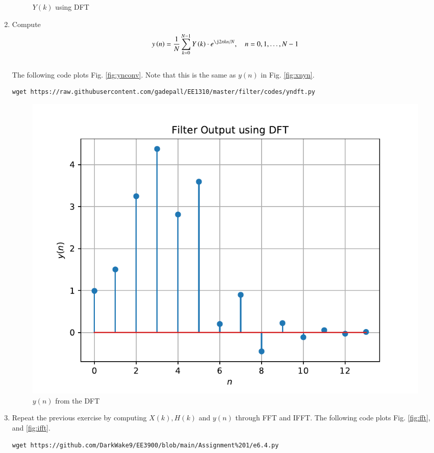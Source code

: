 \documentclass[journal,12pt,twocolumn]{IEEEtran}
\renewcommand\thesection{\arabic{section}}
\begin{document}
\begin{enumerate}[label=\thesection.\arabic*]
\begin{figure}[!ht]
		\caption{$Y(k)$ using DFT}
		\label{fig:Ykdft}
	\end{figure}
	\item Compute
	\begin{equation}
		y\brak{n}={\frac {1}{N}}\sum _{k=0}^{N-1}Y\brak{k}\cdot e^{\j 2\pi kn/N},\quad n = 0,1,\dots, N-1
	\end{equation}
	\\
	\solution The following code plots Fig. \ref{fig:ynconv}. Note that this is the same as 
	$y(n)$ in  Fig. 
	\ref{fig:xnyn}. 
	\begin{lstlisting}
wget https://raw.githubusercontent.com/gadepall/EE1310/master/filter/codes/yndft.py
	\end{lstlisting}
	\begin{figure}[!ht]
		\centering
		\includegraphics[width=\columnwidth]{./figs/yndft}
		\caption{$y(n)$ from the DFT}
		\label{fig:yndft}
	\end{figure}
	\item Repeat the previous exercise by computing $X(k), H(k)$ and $y(n)$ through FFT and 
	IFFT.
	\solution The following code plots Fig. \ref{fig:fft}, and \ref{fig:ifft}. 
	\begin{lstlisting}
wget https://github.com/DarkWake9/EE3900/blob/main/Assignment%201/e6.4.py
	\end{lstlisting}
	\begin{figure}[!ht]
		\centering

\end{figure}
\end{enumerate}
\end{document}

